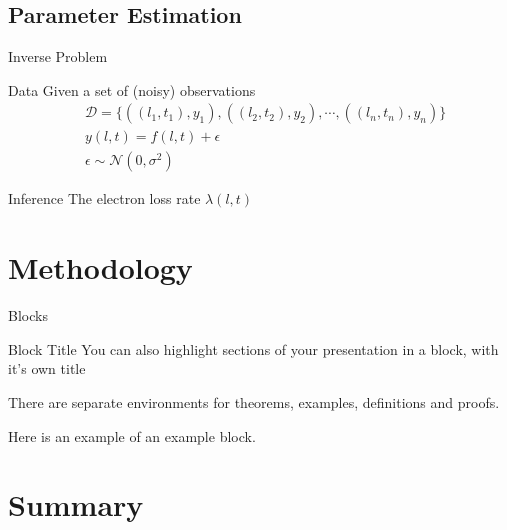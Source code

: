 \documentclass{beamer}
\begin{document}
\subsection{Parameter Estimation}

\begin{frame}{Inverse Problem}
  \begin{block}{Data}
    Given a set of (noisy) observations
    \begin{align*}
      & \mathcal{D} = \{ ((l_1, t_1), y_1), ((l_2, t_2), y_2),
                    \cdots, ((l_n, t_n), y_n) \} \\
      & y(l, t) = f(l, t) + \epsilon \\
      & \epsilon \sim \mathcal{N}(0, \sigma^2)
    \end{align*}
  \end{block}
  
  \begin{block}{Inference}
    The electron loss rate $\lambda(l, t)$
  \end{block}
\end{frame}


\section{Methodology}



\begin{frame}{Blocks}
\begin{block}{Block Title}
You can also highlight sections of your presentation in a block, with it's own title
\end{block}
\begin{theorem}
There are separate environments for theorems, examples, definitions and proofs.
\end{theorem}
\begin{example}
Here is an example of an example block.
\end{example}
\end{frame}

\section*{Summary}
\end{document}
